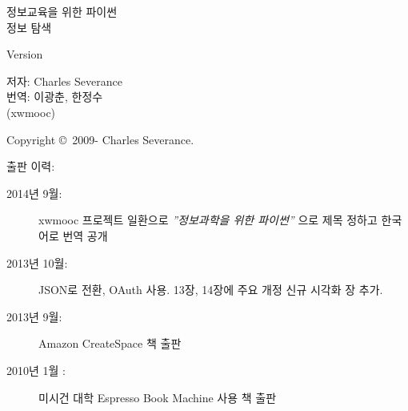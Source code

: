 



\newtheorem{ex}{Exercise}[chapter]

\begin{latexonly}

\renewcommand{\blankpage}{\thispagestyle{empty} \quad \newpage}

\thispagestyle{empty}

\begin{flushright}
\vspace*{2.0in}

\begin{spacing}{3}
{\huge 정보교육을 위한 파이썬}\\
{\Large 정보 탐색}
\end{spacing}

\vspace{0.25in}

Version \theversion

\vspace{0.5in}


{\Large
저자: Charles Severance\\
번역: 이광춘, 한정수 \\
(xwmooc)
}

\vfill

\end{flushright}

\pagebreak
\thispagestyle{empty}

{\small
Copyright \copyright ~2009- Charles Severance.


출판 이력:

\begin{description}

\item[2014년 9월:] xwmooc 프로젝트 일환으로 \emph{''정보과학을 위한 파이썬''} 으로 제목 정하고 한국어로 번역 공개

\item[2013년 10월:] JSON로 전환, OAuth 사용. 13장, 14장에 주요 개정
신규 시각화 장 추가.

\item[2013년 9월:] Amazon CreateSpace 책 출판

\item[2010년 1월 :] 미시건 대학 Espresso Book Machine 사용 책 출판


\end{description}}
\end{latexonly}
